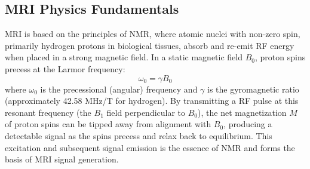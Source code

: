 \subsection{MRI Physics Fundamentals}

MRI is based on the principles of NMR, where atomic nuclei with non-zero spin, primarily hydrogen protons in biological tissues, absorb and re-emit RF energy when placed in a strong magnetic field. In a static magnetic field \(B_0\), proton spins precess at the Larmor frequency:
\begin{equation}
\omega_0 = \gamma B_0
\end{equation}
where \( \omega_0 \) is the precessional (angular) frequency and \( \gamma \) is the gyromagnetic ratio (approximately 42.58 MHz/T for hydrogen). By transmitting a RF pulse at this resonant frequency (the $B_1$ field perpendicular to $B_0$), the net magnetization $M$ of proton spins can be tipped away from alignment with $B_0$, producing a detectable signal as the spins precess and relax back to equilibrium. This excitation and subsequent signal emission is the essence of NMR and forms the basis of MRI signal generation.


